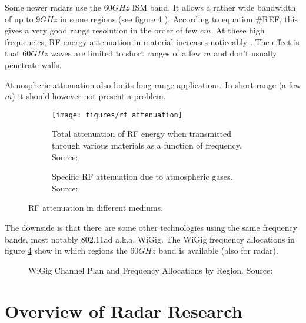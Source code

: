 Some newer radars use the \(60 GHz\) ISM band. It allows a rather wide
bandwidth of up to \(9GHz\) in some regions (see figure \ref{fig:wigig} ).
According to equation \#REF, this gives a very good range resolution in
the order of few \(cm\). At these high frequencies, RF energy
attenuation in material increases noticeably \cite{FerrisJr.1998}. The
effect is that \(60GHz\) waves are limited to short ranges of a few
\(m\) and don't usually penetrate walls.

Atmospheric attenuation also limits long-range applications. In short
range (a few \(m\)) it should however not present a problem.

\begin{figure}[htp]
    \centering
    \begin{subfigure}[b]{0.475\textwidth}
        \label{fig:attenuation}
        \texttt{[image: figures/rf\_attenuation]}
        \caption{Total attenuation of RF energy when transmitted through various materials as a function of frequency. Source: \cite{FerrisJr.1998}}
    \end{subfigure}
    \hfill
    \begin{subfigure}[b]{0.475\textwidth}
        \label{fig:attenuation_air}
        \def\svgwidth{\linewidth} \footnotesize
        
        \caption{Specific RF attenuation due to atmospheric gases. Source: \cite{ITU1997}\bigskip}
    \end{subfigure}
    \caption{RF attenuation in different mediums.}
\end{figure}

The downside is that there are some other technologies using the same
frequency bands, most notably 802.11ad a.k.a.
WiGig\cite{AgilentTechnologies2013}. The WiGig frequency allocations in
figure \ref{fig:wigig} show in which regions the \(60GHz\) band is available (also
for radar).

\begin{figure}[htp]
    \centering
    \label{fig:wigig}
    \def\svgwidth{\linewidth}
    
    \caption{WiGig Channel Plan and Frequency Allocations by Region. Source: \cite{AgilentTechnologies2013}}
\end{figure}

\section{Overview of Radar
Research}\label{overview-of-radar-research}

